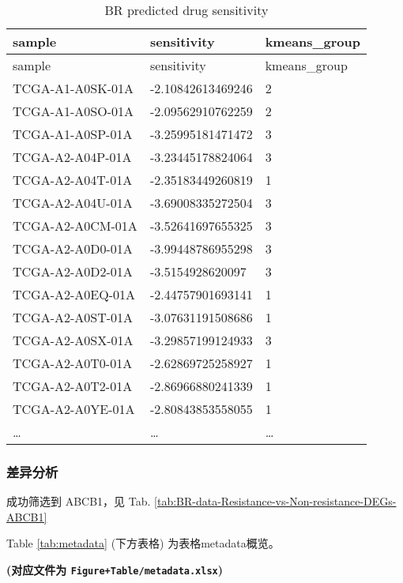 \documentclass[
]{article}
\begin{document}
\begin{longtable}[]{@{}lll@{}}
\caption{\label{tab:BR-predicted-drug-sensitivity}BR predicted drug sensitivity}\tabularnewline
\toprule
sample & sensitivity & kmeans\_group\tabularnewline
\midrule
\endfirsthead
\toprule
sample & sensitivity & kmeans\_group\tabularnewline
\midrule
\endhead
TCGA-A1-A0SK-01A & -2.10842613469246 & 2\tabularnewline
TCGA-A1-A0SO-01A & -2.09562910762259 & 2\tabularnewline
TCGA-A1-A0SP-01A & -3.25995181471472 & 3\tabularnewline
TCGA-A2-A04P-01A & -3.23445178824064 & 3\tabularnewline
TCGA-A2-A04T-01A & -2.35183449260819 & 1\tabularnewline
TCGA-A2-A04U-01A & -3.69008335272504 & 3\tabularnewline
TCGA-A2-A0CM-01A & -3.52641697655325 & 3\tabularnewline
TCGA-A2-A0D0-01A & -3.99448786955298 & 3\tabularnewline
TCGA-A2-A0D2-01A & -3.5154928620097 & 3\tabularnewline
TCGA-A2-A0EQ-01A & -2.44757901693141 & 1\tabularnewline
TCGA-A2-A0ST-01A & -3.07631191508686 & 1\tabularnewline
TCGA-A2-A0SX-01A & -3.29857199124933 & 3\tabularnewline
TCGA-A2-A0T0-01A & -2.62869725258927 & 1\tabularnewline
TCGA-A2-A0T2-01A & -2.86966880241339 & 1\tabularnewline
TCGA-A2-A0YE-01A & -2.80843853558055 & 1\tabularnewline
\ldots{} & \ldots{} & \ldots{}\tabularnewline
\bottomrule
\end{longtable}

\begin{center}\vspace{1.5cm}\end{center}

\hypertarget{ux5deeux5f02ux5206ux6790}{%
\subsubsection{差异分析}\label{ux5deeux5f02ux5206ux6790}}

成功筛选到 ABCB1，见 Tab. \ref{tab:BR-data-Resistance-vs-Non-resistance-DEGs-ABCB1}

\begin{center}\vspace{1.5cm}\end{center}

Table \ref{tab:metadata} (下方表格) 为表格metadata概览。

\textbf{(对应文件为 \texttt{Figure+Table/metadata.xlsx})}
\end{document}
